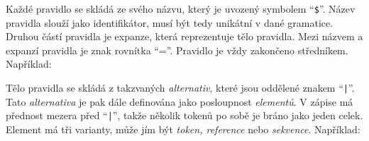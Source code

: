 Každé pravidlo se skládá ze svého názvu, který je uvozený symbolem \enquote{\texttt{\$}}.
Název pravidla slouží jako identifikátor, musí být tedy unikátní v dané gramatice.
Druhou částí pravidla je expanze, která reprezentuje tělo pravidla.
Mezi názvem a expanzí pravidla je znak rovnítka \enquote{=}.
Pravidlo je vždy zakončeno středníkem.
Například:
\begin{center}
\end{center}

Tělo pravidla se skládá z takzvaných \emph{alternativ}, které jsou oddělené znakem \enquote{\texttt{|}}.
Tato \emph{alternativa} je pak dále definována jako posloupnost \emph{elementů}.
V zápise má přednost mezera před \enquote{\texttt{|}}, takže několik tokenů po sobě je bráno jako jeden celek.
Element má tři varianty, může jím být \emph{token, reference} nebo \emph{sekvence}.
Například:

